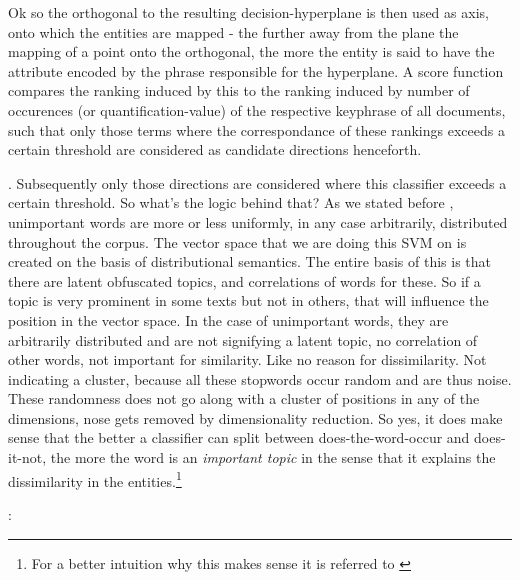 Ok so the orthogonal to the resulting decision-hyperplane is then used as axis, onto which the entities are mapped - the further away from the plane the mapping of a point onto the orthogonal, the more the entity is said to have the attribute encoded by the phrase responsible for the hyperplane. A score function compares the ranking induced by this to the ranking induced by number of occurences (or quantification-value) of the respective keyphrase of all documents, such that only those terms where the correspondance of these rankings exceeds a certain threshold are considered as candidate directions henceforth.

 . Subsequently only those directions are considered where this classifier exceeds a certain threshold. So what's the logic behind that? As we stated before , unimportant words are more or less uniformly, in any case arbitrarily, distributed throughout the corpus. The vector space that we are doing this SVM on is created on the basis of distributional semantics. The entire basis of this is that there are latent obfuscated topics, and correlations of words for these. So if a topic is very prominent in some texts but not in others, that will influence the position in the vector space. In the case of unimportant words, they are arbitrarily distributed and are not signifying a latent topic, no correlation of other words, not important for similarity. Like no reason for dissimilarity. Not indicating a cluster, because all these stopwords occur random and are thus noise. These randomness does not go along with a cluster of positions in any of the dimensions, nose gets removed by dimensionality reduction. So yes, it does make sense that the better a classifier can split between does-the-word-occur and does-it-not, the more the word is an \textit{important topic} in the sense that it explains the dissimilarity in the entities.\footnote{For a better intuition why this makes sense it is referred to \cite{Lowe}}

\cite{Ager2018}: 



